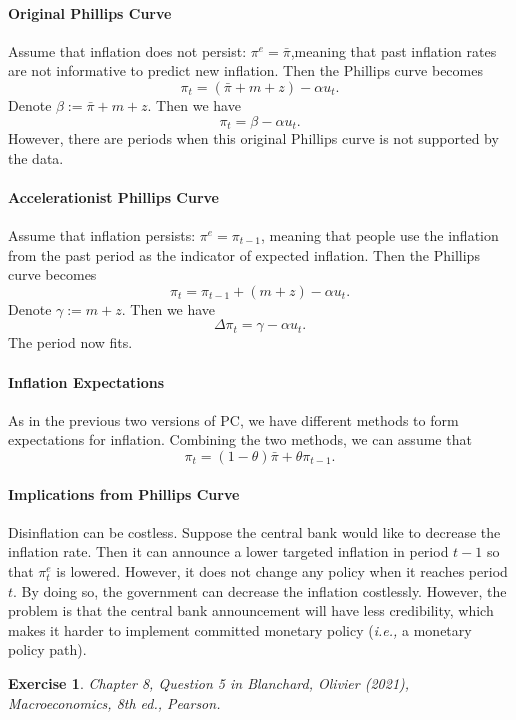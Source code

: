 \documentclass[12pt]{article}
\newtheorem{exercise}{Exercise}
\begin{document}
\paragraph{Original Phillips Curve}
Assume that inflation does not persist: $\pi^e = \bar{\pi}$,meaning that past inflation rates are not informative to predict new inflation. Then the Phillips curve becomes
\[\pi_t = (\bar{\pi}+m+z) - \alpha u_t.\]
Denote $\beta := \bar{\pi}+m+z$. Then we have
\[\pi_t = \beta - \alpha u_t.\]
However, there are periods when this original Phillips curve is not supported by the data.

\paragraph{Accelerationist Phillips Curve}
Assume that inflation persists: $\pi^e = \pi_{t-1}$, meaning that people use the inflation from the past period as the indicator of expected inflation. Then the Phillips curve becomes
\[\pi_t = \pi_{t-1} + (m+z) - \alpha u_t.\]
Denote $\gamma := m+z$. Then we have
\[\Delta \pi_t = \gamma - \alpha u_t.\]
The period now fits.

\paragraph{Inflation Expectations}
As in the previous two versions of PC, we have different methods to form expectations for inflation. Combining the two methods, we can assume that
\[\pi_t = (1-\theta)\bar{\pi} + \theta\pi_{t-1}.\]

\paragraph{Implications from Phillips Curve}
Disinflation can be costless. Suppose the central bank would like to decrease the inflation rate. Then it can announce a lower targeted inflation in period $t-1$ so that $\pi_t^e$ is lowered. However, it does not change any policy when it reaches period $t$. By doing so, the government can decrease the inflation costlessly. However, the problem is that the central bank announcement will have less credibility, which makes it harder to implement committed monetary policy (\textit{i.e., } a monetary policy path).


\begin{exercise}
    Chapter 8, Question 5 in Blanchard, Olivier (2021), \textit{Macroeconomics}, 8th ed., Pearson.
\end{exercise}
\end{document}
